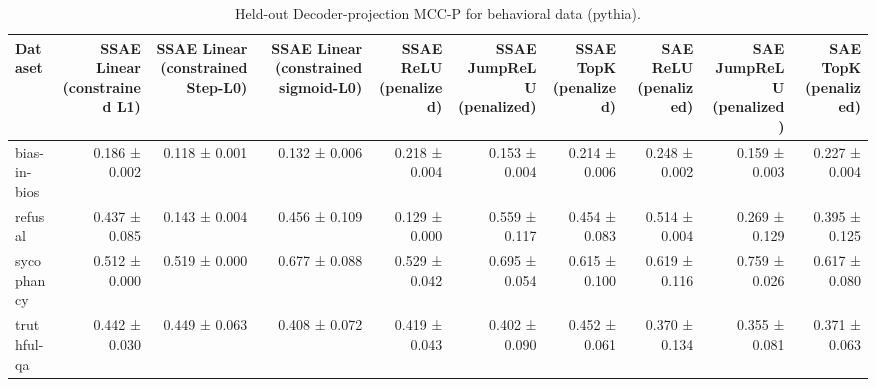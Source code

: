 \begin{table}[t]
\centering
\caption{Held-out Decoder-projection MCC-P for behavioral data (pythia).}
\label{tab:behavioral-pythia-decoder-projection-mcc-p}
\begin{tabular}{lrrrrrrrrr}
\toprule
Dataset & SSAE Linear (constrained L1) & SSAE Linear (constrained Step-L0) & SSAE Linear (constrained sigmoid-L0) & SSAE ReLU (penalized) & SSAE JumpReLU (penalized) & SSAE TopK (penalized) & SAE ReLU (penalized) & SAE JumpReLU (penalized) & SAE TopK (penalized) \\
\midrule
bias-in-bios & 0.186 ± 0.002 & 0.118 ± 0.001 & 0.132 ± 0.006 & 0.218 ± 0.004 & 0.153 ± 0.004 & 0.214 ± 0.006 & 0.248 ± 0.002 & 0.159 ± 0.003 & 0.227 ± 0.004 \\
refusal & 0.437 ± 0.085 & 0.143 ± 0.004 & 0.456 ± 0.109 & 0.129 ± 0.000 & 0.559 ± 0.117 & 0.454 ± 0.083 & 0.514 ± 0.004 & 0.269 ± 0.129 & 0.395 ± 0.125 \\
sycophancy & 0.512 ± 0.000 & 0.519 ± 0.000 & 0.677 ± 0.088 & 0.529 ± 0.042 & 0.695 ± 0.054 & 0.615 ± 0.100 & 0.619 ± 0.116 & 0.759 ± 0.026 & 0.617 ± 0.080 \\
truthful-qa & 0.442 ± 0.030 & 0.449 ± 0.063 & 0.408 ± 0.072 & 0.419 ± 0.043 & 0.402 ± 0.090 & 0.452 ± 0.061 & 0.370 ± 0.134 & 0.355 ± 0.081 & 0.371 ± 0.063 \\
\bottomrule
\end{tabular}
\end{table}
